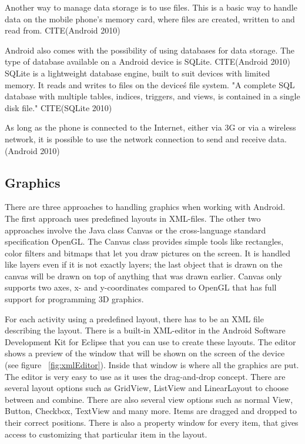 Another way to manage data storage is to use files. This is a basic way to handle data on the mobile phone's memory card, where files are created, written to and read from. CITE(Android 2010) 

Android also comes with the possibility of using databases for data storage. The type of database available on a Android device is SQLite. CITE(Android 2010) SQLite is a lightweight database engine, built to suit devices with limited memory. It reads and writes to files on the device\'s file system. "A complete SQL database with multiple tables, indices, triggers, and views, is contained in a single disk file." CITE(SQLite 2010)

As long as the phone is connected to the Internet, either via 3G or via a wireless network, it is possible to use the network connection to send and receive data. (Android 2010)
\subsection{Graphics}

There are three approaches to handling graphics when working with Android. The first approach uses predefined layouts in XML-files. The other two approaches involve the Java class Canvas or the cross-language standard specification OpenGL. The Canvas class provides simple tools like rectangles, color filters and bitmaps that let you draw pictures on the screen. It is handled like layers even if it is not exactly layers; the last object that is drawn on the canvas will be drawn on top of anything that was drawn earlier. Canvas only supports two axes, x- and y-coordinates compared to OpenGL that has full support for programming 3D graphics.

For each activity using a predefined layout, there has to be an XML file describing the layout. There is a built-in XML-editor in the Android Software Development Kit for Eclipse that you can use to create these layouts. The editor shows a preview of the window that will be shown on the screen of the device (see figure ~\ref{fig:xmlEditor}). Inside that window is where all the graphics are put. The editor is very easy to use as it uses the drag-and-drop concept. There are several layout options such as GridView, ListView and LinearLayout to choose between and combine. There are also several view options such as normal View, Button, Checkbox, TextView and many more. Items are dragged and dropped to their correct positions. There is also a property window for every item, that gives access to customizing that particular item in the layout. 

